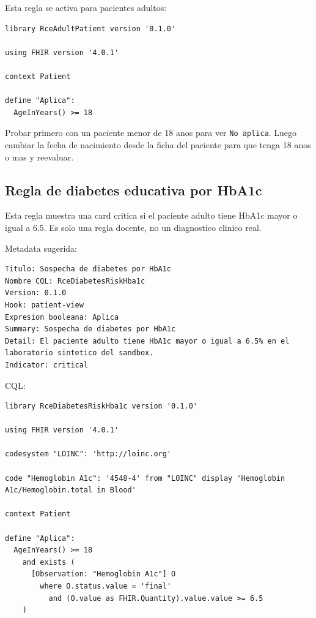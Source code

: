 Esta regla se activa para pacientes adultos:

\begin{lstlisting}
library RceAdultPatient version '0.1.0'

using FHIR version '4.0.1'

context Patient

define "Aplica":
  AgeInYears() >= 18
\end{lstlisting}

Probar primero con un paciente menor de 18 anos para ver \texttt{No aplica}.
Luego cambiar la fecha de nacimiento desde la ficha del paciente para que tenga
18 anos o mas y reevaluar.


\subsection{Regla de diabetes educativa por HbA1c}

Esta regla muestra una card critica si el paciente adulto tiene HbA1c mayor o
igual a 6.5. Es solo una regla docente, no un diagnostico clinico real.

Metadata sugerida:

\begin{lstlisting}
Titulo: Sospecha de diabetes por HbA1c
Nombre CQL: RceDiabetesRiskHba1c
Version: 0.1.0
Hook: patient-view
Expresion booleana: Aplica
Summary: Sospecha de diabetes por HbA1c
Detail: El paciente adulto tiene HbA1c mayor o igual a 6.5% en el laboratorio sintetico del sandbox.
Indicator: critical
\end{lstlisting}

CQL:

\begin{lstlisting}
library RceDiabetesRiskHba1c version '0.1.0'

using FHIR version '4.0.1'

codesystem "LOINC": 'http://loinc.org'

code "Hemoglobin A1c": '4548-4' from "LOINC" display 'Hemoglobin A1c/Hemoglobin.total in Blood'

context Patient

define "Aplica":
  AgeInYears() >= 18
    and exists (
      [Observation: "Hemoglobin A1c"] O
        where O.status.value = 'final'
          and (O.value as FHIR.Quantity).value.value >= 6.5
    )
\end{lstlisting}

